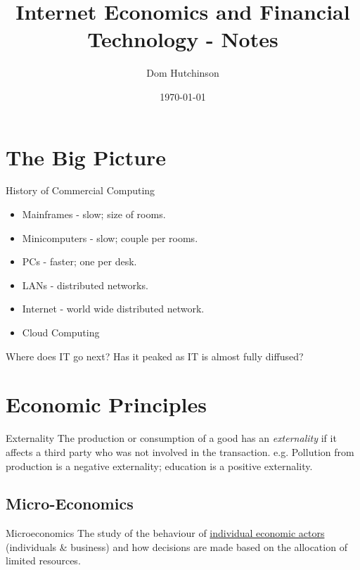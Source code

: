 \documentclass[11pt,a4paper]{article}
\begin{document}
\title{Internet Economics and Financial Technology - Notes}
\author{Dom Hutchinson}
\date{\today}
\maketitle

\tableofcontents\newpage

\section{The Big Picture}

\begin{remark}{History of Commercial Computing}
  \begin{itemize}
    \item[\textit{1950-60}] Mainframes - slow; size of rooms.
    \item[\textit{1960-70}] Minicomputers - slow; couple per rooms.
    \item[\textit{1970-80}] PCs - faster; one per desk.
    \item[\textit{1980-90}] LANs - distributed networks.
    \item[\textit{1990-10}] Internet - world wide distributed network.
    \item[\textit{2010-20}] Cloud Computing
  \end{itemize}
  Where does IT go next? Has it peaked as IT is almost fully diffused?
\end{remark}

\section{Economic Principles}

\begin{definition}{Externality}
  The production or consumption of a good has an \textit{externality} if it affects a third party who was not involved in the transaction. e.g. Pollution from production is a negative externality; education is a positive externality.
\end{definition}

\subsection{Micro-Economics}

\begin{definition}{Microeconomics}
  The study of the behaviour of \underline{individual economic actors} (individuals \& business) and how decisions are made based on the allocation of limited resources.
\end{definition}
\end{document}
